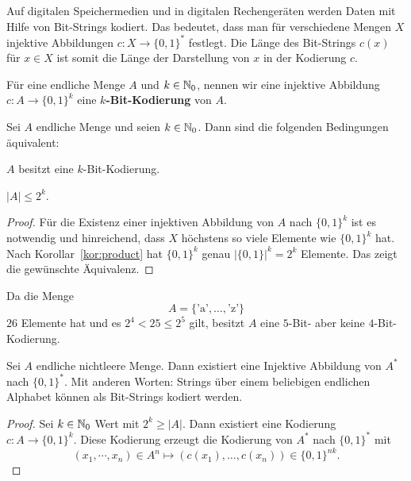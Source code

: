 \begin{bem}
	Auf digitalen Speichermedien und in digitalen Rechengeräten werden Daten mit Hilfe von Bit-Strings kodiert. Das bedeutet, dass man für verschiedene Mengen $X$ injektive Abbildungen $c : X \to \{0,1\}^\ast$ festlegt. Die Länge des Bit-Strings $c(x)$ für $x \in X$ ist somit die Länge der Darstellung von $x$ in der Kodierung $c$. 
\end{bem} 

\begin{defn}
	Für eine endliche Menge $A$ und $k \in \mathbb{N}_0$, nennen wir eine injektive Abbildung $c: A \to \{0,1\}^k$ eine \textbf{$k$-Bit-Kodierung} von $A$. 
\end{defn} 

\begin{prop}
Sei $A$ endliche Menge und seien $k \in \mathbb{N}_0$. Dann sind die folgenden Bedingungen äquivalent: 
\begin{enumi} 
	\item $A$ besitzt eine $k$-Bit-Kodierung.
	\item $ |A| \le 2^k$. 
\end{enumi} 
\end{prop} 
\begin{proof} 
	Für die Existenz einer injektiven Abbildung von $A$ nach $\{0,1\}^k$ ist es notwendig und hinreichend, dass $X$ höchstens so viele Elemente wie $\{0,1\}^k$ hat. Nach Korollar~\ref{kor:product}  hat $\{0,1\}^k$ genau $|\{0,1\}|^k = 2^k$ Elemente. Das zeigt die gewünschte Äquivalenz. 
\end{proof} 

\begin{bsp}
	Da die Menge 
	\[
		A = \{\text{'a'},\ldots,\text{'z'}\}
	\]
	$26$ Elemente hat und es $2^4 < 25 \le 2^5$ gilt, besitzt $A$ eine $5$-Bit- aber keine $4$-Bit-Kodierung. 
\end{bsp} 

\begin{prop} \label{prop:beliebiges:alphabet->01}
	Sei $A$ endliche nichtleere Menge. Dann existiert eine Injektive Abbildung von $A^\ast$ nach $\{0,1\}^\ast$. Mit anderen Worten: Strings über einem beliebigen endlichen Alphabet können als Bit-Strings kodiert werden. 
\end{prop} 
\begin{proof} 
	Sei $k \in \mathbb{N}_0$ Wert mit $2^k \ge |A|$. Dann existiert eine Kodierung $ c : A \to \{0,1\}^k$. Diese Kodierung erzeugt die Kodierung  von $A^\ast$ nach $\{0,1\}^\ast$ mit
	\[
		(x_1, \cdots ,x_n) \in A^n \mapsto (c(x_1),\ldots,c(x_n)) \in \{0,1\}^{nk}.
	\]
\end{proof} 


